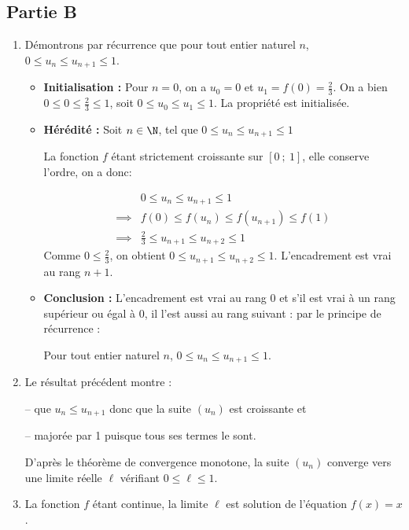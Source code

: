 \subsection*{Partie B}
\begin{enumerate}
\item Démontrons par récurrence que pour tout entier naturel $n$, $0 \leqslant u_n \leqslant u_{n+1} \leqslant 1$.
\begin{itemize}
\item \textbf{Initialisation :} Pour $n = 0$, on a $u_0 = 0$ et $u_1 = f(0) = \frac{2}{3}$. On a bien $0 \leqslant 0 \leqslant \frac{2}{3} \leqslant 1$, soit $0 \leqslant u_0 \leqslant u_1 \leqslant 1$. La propriété est initialisée.
\item \textbf{Hérédité :} Soit $n \in \N$, tel que $0 \leqslant u_n \leqslant u_{n+1} \leqslant 1$

La fonction $f$ étant strictement croissante sur $[0~;~1]$, elle conserve l'ordre, on a donc:

\[\begin{array}{rl}
& 0 \leqslant u_n \leqslant u_{n+1} \leqslant 1 \\
\implies & f(0) \leqslant f(u_n) \leqslant f(u_{n+1}) \leqslant f(1) \\
\implies & \frac{2}{3} \leqslant u_{n+1} \leqslant u_{n+2} \leqslant 1
\end{array}
\]
Comme $0 \leqslant \frac{2}{3}$, on obtient $0 \leqslant u_{n+1} \leqslant u_{n+2} \leqslant 1$. L'encadrement est vrai au rang $n + 1$.
\item \textbf{Conclusion :} L'encadrement est vrai au rang 0 et s'il est vrai à un rang supérieur ou égal à 0, il l'est aussi au rang suivant : par le principe de récurrence :

Pour tout entier naturel $n$, $0 \leqslant u_n \leqslant u_{n+1} \leqslant 1$.
\end{itemize}

\item Le résultat précédent montre :

-- que $u_n \leqslant u_{n+1}$ donc que la suite $(u_n)$ est croissante et 

-- majorée par 1 puisque tous ses termes le sont.

D'après le théorème de convergence monotone, la suite $(u_n)$ converge vers une limite réelle $\ell$ vérifiant $0 \leqslant \ell \leqslant 1$.

\item La fonction $f$ étant continue, la limite $\ell$ est solution de l'équation $f(x) = x$.


\end{enumerate}
